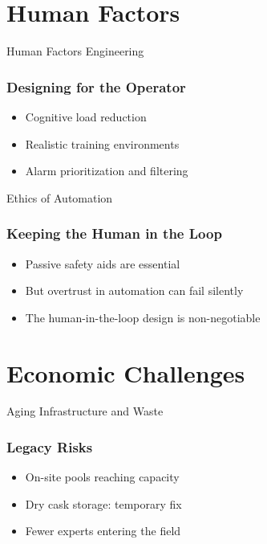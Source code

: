 \documentclass{beamer}
\begin{document}
\section{Human Factors}

\begin{frame}{Human Factors Engineering}
  \subsubsection*{Designing for the Operator}
  \begin{itemize}
    \item Cognitive load reduction
    \item Realistic training environments
    \item Alarm prioritization and filtering
  \end{itemize}
\end{frame}

\begin{frame}{Ethics of Automation}
  \subsubsection*{Keeping the Human in the Loop}
  \begin{itemize}
    \item Passive safety aids are essential
    \item But overtrust in automation can fail silently
    \item The human-in-the-loop design is non-negotiable
  \end{itemize}
\end{frame}

\section{Economic Challenges}

\begin{frame}{Aging Infrastructure and Waste}
  \subsubsection*{Legacy Risks}
  \begin{itemize}
    \item On-site pools reaching capacity
    \item Dry cask storage: temporary fix
    \item Fewer experts entering the field
  \end{itemize}
\end{frame}
\end{document}
